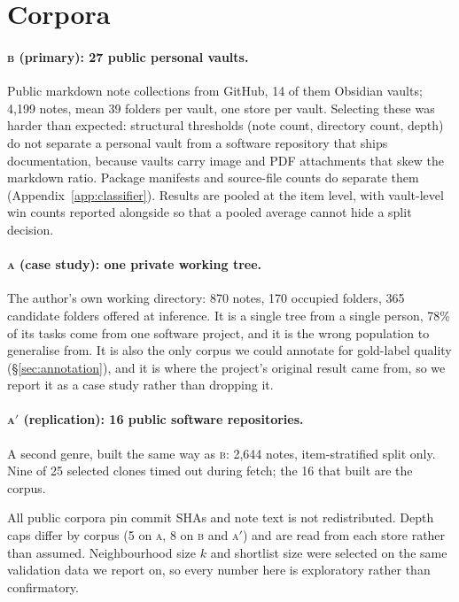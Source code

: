 \documentclass[11pt]{article}
\newcommand{\corpA}{\textsc{a}}
\newcommand{\corpB}{\textsc{b}}
\newcommand{\corpAp}{\textsc{a}$'$}
\begin{document}
\section{Corpora}
\label{sec:corpora}

\paragraph{\corpB{} (primary): 27 public personal vaults.}
Public markdown note collections from GitHub, 14 of them Obsidian vaults; 4{,}199 notes, mean 39 folders per vault, one store per vault.
Selecting these was harder than expected: structural thresholds (note count, directory count, depth) do not separate a personal vault from a software repository that ships documentation, because vaults carry image and PDF attachments that skew the markdown ratio.
Package manifests and source-file counts do separate them (Appendix~\ref{app:classifier}).
Results are pooled at the item level, with vault-level win counts reported alongside so that a pooled average cannot hide a split decision.

\paragraph{\corpA{} (case study): one private working tree.}
The author's own working directory: 870 notes, 170 occupied folders, 365 candidate folders offered at inference.
It is a single tree from a single person, 78\% of its tasks come from one software project, and it is the wrong population to generalise from.
It is also the only corpus we could annotate for gold-label quality (\S\ref{sec:annotation}), and it is where the project's original result came from, so we report it as a case study rather than dropping it.

\paragraph{\corpAp{} (replication): 16 public software repositories.}
A second genre, built the same way as \corpB{}: 2{,}644 notes, item-stratified split only.
Nine of 25 selected clones timed out during fetch; the 16 that built are the corpus.

All public corpora pin commit SHAs and note text is not redistributed.
Depth caps differ by corpus (5 on \corpA{}, 8 on \corpB{} and \corpAp{}) and are read from each store rather than assumed.
Neighbourhood size $k$ and shortlist size were selected on the same validation data we report on, so every number here is exploratory rather than confirmatory.
\end{document}

